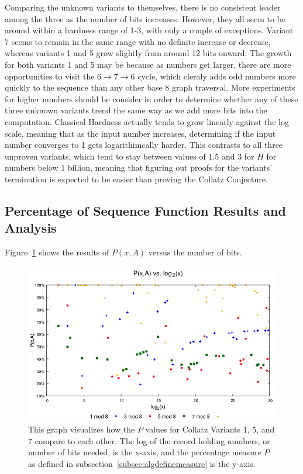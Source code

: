 Comparing the unknown variants to themselves, there is no consistent leader among the three as the number of bits increases. However, they all seem to be around within a hardness range of 1-3, with only a couple of exceptions. Variant 7 seems to remain in the same range with no definite increase or decrease, whereas variants 1 and 5 grow slightly from around 12 bits onward. The growth for both variants 1 and 5 may be because as numbers get larger, there are more opportunities to visit the $6 \rightarrow 7 \rightarrow 6$ cycle, which cleraly adds odd numbers more quickly to the sequence than any other base 8 graph traversal. More experiments for higher numbers should be consider in order to determine whether any of these three unknown variants trend the same way as we add more bits into the computation.
Classical Hardness actually tends to grow linearly against the log scale, meaning that as the input number increases, determining if the input number converges to 1 gets logarithimcally harder. This contrasts to all three unproven variants, which tend to stay between values of 1.5 and 3 for $H$ for numbers below 1 billion, meaning that figuring out proofs for the variants' termination is expected to be easier than proving the Collatz Conjecture.
\subsection{Percentage of Sequence Function Results and Analysis} \label{subsubsec:algsinpercentage}
 Figure~\ref{fig:pvslog} shows the results of $P(x,A)$ versus the number of bits.\par 
\begin{figure}
    \centering
    \includegraphics[scale=0.75]{ModAvoidanceAnalysisPics/P_vs_log.png}
    \caption{This graph visualizes how the $P$ values for Collatz Variants 1, 5, and 7 compare to each other. The log of the record holding numbers, or number of bits needed, is the x-axis, and the percentage measure $P$ as defined in subsection~\ref{subsec:algdefinemeasure} is the y-axis.}
    \label{fig:pvslog}
\end{figure}

